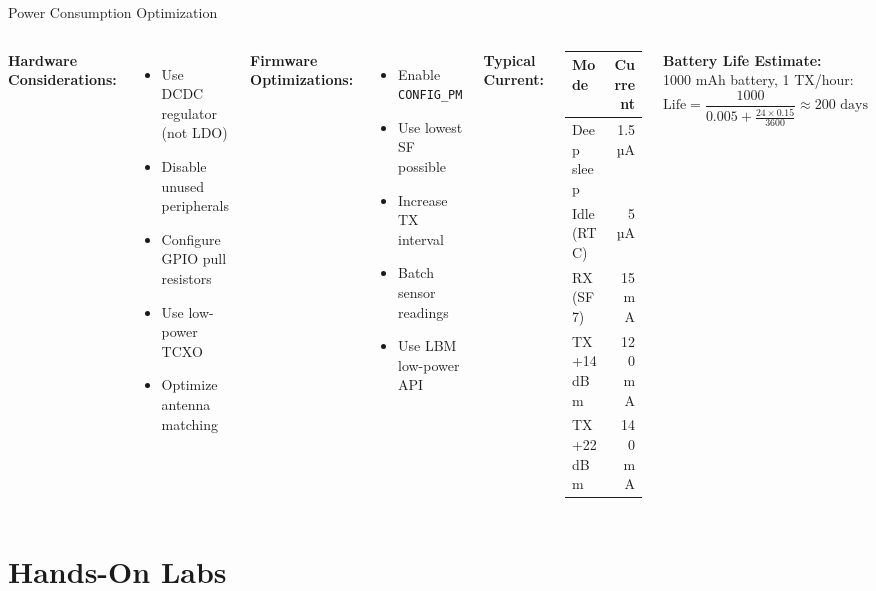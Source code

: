 \documentclass{beamer}
\begin{document}
\begin{frame}{Power Consumption Optimization}
\begin{columns}
\textbf{Hardware Considerations:}
\begin{itemize}
    \item Use DCDC regulator (not LDO)
    \item Disable unused peripherals
    \item Configure GPIO pull resistors
    \item Use low-power TCXO
    \item Optimize antenna matching
\end{itemize}

\vspace{0.3cm}

\textbf{Firmware Optimizations:}
\begin{itemize}
    \item Enable \texttt{CONFIG\_PM}
    \item Use lowest SF possible
    \item Increase TX interval
    \item Batch sensor readings
    \item Use LBM low-power API
\end{itemize}

\textbf{Typical Current:}

\tiny
\begin{tabular}{|l|r|}
\hline
\textbf{Mode} & \textbf{Current} \\
\hline
Deep sleep & 1.5 µA \\
Idle (RTC) & 5 µA \\
RX (SF7) & 15 mA \\
TX +14dBm & 120 mA \\
TX +22dBm & 140 mA \\
\hline
\end{tabular}

\normalsize
\vspace{0.3cm}

\textbf{Battery Life Estimate:}\\
\tiny
1000 mAh battery, 1 TX/hour:
\[
\text{Life} = \frac{1000}{0.005 + \frac{24 \times 0.15}{3600}} \approx 200 \text{ days}
\]
\end{columns}
\end{frame}

\section{Hands-On Labs}
\end{document}
